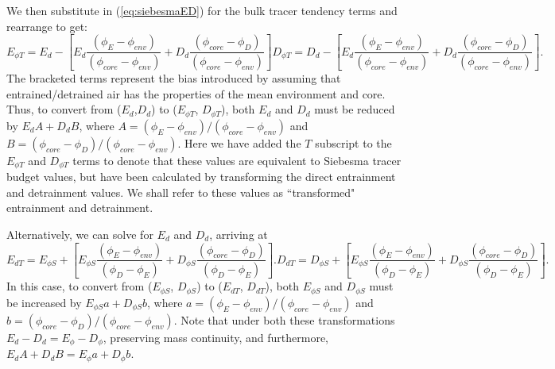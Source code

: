 \documentclass[12pt]{article}
\begin{document}
We then substitute in (\ref{eq:siebesmaED})
for the bulk tracer tendency terms and 
rearrange to get:
\begin{subequations}
  \label{eq:correctedED}
\begin{equation}
  \label{eq:corrected_entrainment}
    E_{\phi T} = E_d 
             - \left[E_d\frac{(\phi_E - \phi_{env})}{(\phi_{core} - \phi_{env})}
                   + D_d\frac{(\phi_{core} - \phi_D)}{(\phi_{core} - \phi_{env})}\right]
\end{equation}
\begin{equation}
  \label{eq:corrected_detrainment}
    D_{\phi T} = D_d
             - \left[E_d\frac{(\phi_E - \phi_{env})}{(\phi_{core} - \phi_{env})}
                   + D_d\frac{(\phi_{core} - \phi_D)}{(\phi_{core} - \phi_{env})}\right].
\end{equation}
\end{subequations}
The bracketed terms represent the bias introduced by assuming that
entrained/detrained air has the properties of the mean environment and
core.  Thus, to convert from ($E_d$,$D_d$) to ($E_{\phi T}$, $D_{\phi  T}$), 
both $E_d$ and $D_d$ must be reduced by $E_d A + D_d B$, where
$A = (\phi_E - \phi_{env})/(\phi_{core} - \phi_{env})$ and $B =
(\phi_{core} - \phi_D)/(\phi_{core} - \phi_{env})$.  Here we have
added the $T$ subscript to the $E_{\phi T}$ and $D_{\phi T}$ terms to
denote that these values are equivalent to Siebesma tracer budget values,
but have been calculated by transforming the direct entrainment and
detrainment values.  We shall refer to these values as ``transformed"
entrainment and detrainment.

Alternatively, we can solve for $E_d$ and $D_d$, arriving at
\begin{subequations}
\begin{equation}
  \label{eq:corrected_entrainment2}
    E_{d T} = E_{\phi S} 
        + \left[E_{\phi S}\frac{(\phi_E - \phi_{env})}{(\phi_D - \phi_E)} 
              + D_{\phi S}\frac{(\phi_{core} - \phi_D)}{(\phi_D - \phi_E)}\right].
\end{equation}
\begin{equation}
  \label{eq:corrected_detrainment2}
    D_{d T} = D_{\phi S} 
        + \left[E_{\phi S}\frac{(\phi_E - \phi_{env})}{(\phi_D - \phi_E)}
              + D_{\phi S}\frac{(\phi_{core} - \phi_D)}{(\phi_D - \phi_E)}\right].
\end{equation}
\end{subequations}
In this case, to convert from ($E_{\phi S}$, $D_{\phi S}$) to
($E_{dT}$, $D_{dT}$), both $E_{\phi S}$ and $D_{\phi S}$ must be
increased by $E_{\phi S} a + D_{\phi S} b$, where $a = (\phi_E -
\phi_{env})/(\phi_{core} - \phi_{env})$ and $b = (\phi_{core} -
\phi_D)/(\phi_{core} - \phi_{env})$.  Note that under both these
transformations $E_d-D_d = E_{\phi}-D_{\phi}$, preserving mass
continuity, and furthermore, $E_d A + D_d B = E_{\phi} a + D_{\phi}
b$.
\end{document}

